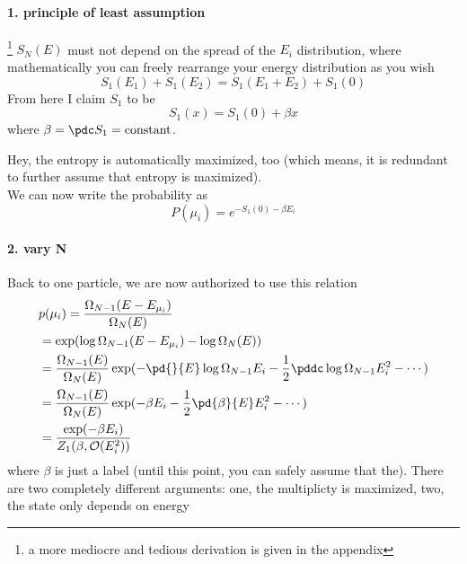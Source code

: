             \paragraph{1. principle of least assumption}
            \footnote{a more mediocre and tedious derivation is given in the appendix}
            $S_N(E)$ must not depend on the spread of the $E_i$ distribution,
            where mathematically you can freely rearrange your energy distribution as you wish
            \[S_1(E_1) + S_1(E_2) = S_1(E_1+E_2) + S_1(0) \]
            From here I claim $S_1$ to be
            \[ S_1(x) = S_1(0) + \beta x\]
            where $\beta = \pdc S_1 = \mathrm{constant}$.


            Hey, the entropy is automatically maximized, too
            (which means, it is redundant to further assume that entropy is maximized).\\
            We can now write the probability as
            \[ P(\mu_i) = e^{-S_1(0) -\beta E_i} \]


            \paragraph{2. vary N}
            Back to one particle, we are now authorized to use this relation
            \begin{align*}
                &p(\mu_i) = \frac{\Omega_{N -1}(E-E_{\mu_i})}{\Omega_N(E)} \\
                &= \exp(\log\Omega_{N-1}(E-E_{\mu_i}) - \log \Omega_N(E))\\
                & = \frac{\Omega_{N-1}( E )}{\Omega_N(E)}
                    \exp( -\pd{}{E}\log \Omega_{N-1}E_i
                          - \frac12\pddc \log\Omega_{N-1}E_i^2
                          - \cdots
                          )\\
                & = \frac{\Omega_{N-1}( E )}{\Omega_N(E)}
                    \exp(-\beta E_i
                         -\frac12 \pd{\beta}{E} E_i^2
                         - \cdots  )\\
                & = \frac{\exp(-\beta E_i)}{Z_1(\beta,\mathcal{O}(E_i^2))}\\ 
            \end{align*}
            where $\beta$ is just a label
            (until this point, you can safely assume that the).
            There are two completely different arguments:
            one, the multiplicty is maximized, two, the state only depends on energy

